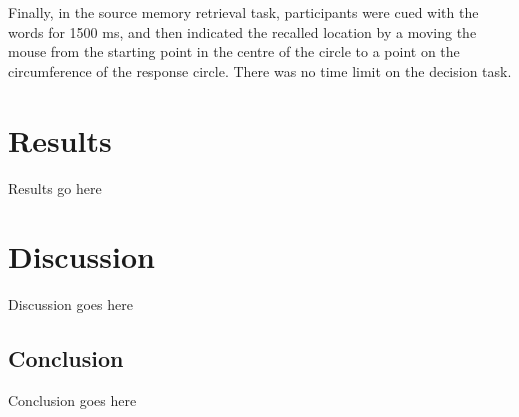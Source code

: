 \documentclass[10pt, a4paper, man, biblatex]{apa6}
\begin{document}
\par Finally, in the source memory retrieval task, participants were cued with the words for 1500 ms, and then indicated the recalled location by a moving the mouse from the starting point in the centre of the circle to a point on the circumference of the response circle. There was no time limit on the decision task.

\section{Results}
Results go here

\section{Discussion}
Discussion goes here

\subsection{Conclusion}
Conclusion goes here


\printbibliography
\end{document}
